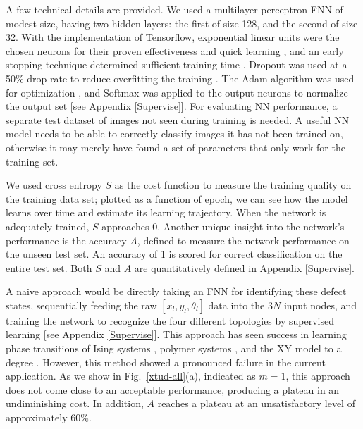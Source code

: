 A few technical details are provided.
We used a multilayer perceptron FNN of modest size, having two hidden layers: the first of size 128, and the second of size 32.
With the implementation of Tensorflow, exponential linear units were the chosen neurons for their proven effectiveness and quick learning \cite{elu,tensorflow}, and an early stopping technique determined sufficient training time \cite{nntricks}. Dropout was used at a 50\% drop rate to reduce overfitting the training \cite{dropout}.
The Adam algorithm was used for optimization \cite{adam}, and Softmax was applied to the output neurons to normalize the output set [see Appendix \ref{Supervise}].
For evaluating NN performance, a separate test dataset of images not seen during training is needed. A useful NN model needs to be able to correctly classify images it has not been trained on, otherwise it may merely have found a set of parameters that only work for the training set.

We used cross entropy $S$ as the cost function to measure the training quality on the training data set;
plotted as a function of epoch, we can see how the model learns over time and estimate its learning trajectory.
When the network is adequately trained, $S$ approaches 0. Another unique insight into the network's performance is the accuracy $A$, defined to measure the network performance on the unseen test set. An accuracy of 1 is scored for correct classification on the entire test set. Both $S$ and $A$ are quantitatively defined in Appendix \ref{Supervise}.


A naive approach would be directly taking an FNN for identifying these defect states, sequentially feeding the raw $[x_l,y_l,\theta_l]$ data into the $3N$ input nodes, and training the network to recognize the four different topologies by supervised learning [see Appendix \ref{Supervise}].
This approach has seen success in learning phase transitions of Ising systems \cite{carras}, polymer systems \cite{wei}, and the XY model to a degree \cite{beach}. However, this method showed a pronounced failure in the current application.
As we show in Fig.~\ref{xtud-all}(a), indicated as $m=1$, this approach does not come close to an acceptable performance, producing a plateau in an undiminishing cost. In addition, $A$ reaches a plateau at an unsatisfactory level of approximately $60\%$.

